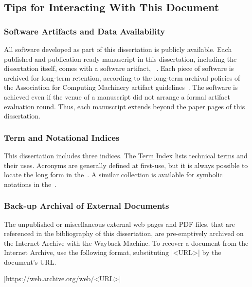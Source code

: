 \subsection{Tips for Interacting With This Document}
\label{subsec:tips}

\subsubsection{Software Artifacts and Data Availability}\label{subsub:sw}

All software developed as part of this dissertation is publicly available.
Each published and publication-ready manuscript in this dissertation, including the dissertation itself, comes with a software artifact, \cf~.
Each piece of software is archived for long-term retention, according to the long-term archival policies of the Association for Computing Machinery artifact guidelines~\cite{acm_badging}.
The software is achieved even if the venue of a manuscript did not arrange a formal artifact evaluation round.
Thus, each manuscript extends beyond the paper pages of this dissertation.

\subsubsection{Term and Notational Indices}

This dissertation includes three indices.
The \hyperref[sec:app:index]{Term Index} lists technical terms and their uses.
Acronyms are generally defined at first-use, but it is always possible to locate the long form in the~\nameref{\acronymtype}.
A similar collection is available for symbolic notations in the~.

\subsubsection{Back-up Archival of External Documents}

The unpublished or miscellaneous external web pages and PDF files, that are referenced in the bibliography of this dissertation,
are pre-emptively archived on the Internet Archive with the Wayback Machine.
To recover a document from the Internet Archive, use the following format, substituting \pr|<URL>| by the document's URL\@.

\begin{center}
\pr|https://web.archive.org/web/<URL>|
\end{center}

